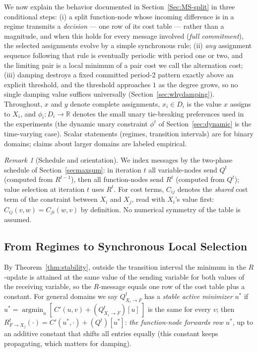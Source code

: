 \documentclass[letterpaper]{article} %
\theoremstyle{definition}
\theoremstyle{remark}
\newtheorem{remark}[theorem]{Remark}
\begin{document}
We now explain the behavior documented in Section~\ref{Sec:MS-split} in
three conditional steps: (i) a split function-node whose incoming
difference is in a regime transmits a \emph{decision} --- one row of its
cost table --- rather than a magnitude, and when this holds for every
message involved (\emph{full commitment}), the selected assignments evolve
by a simple synchronous rule; (ii) \emph{any} assignment sequence
following that rule is eventually periodic with period one or two, and the
limiting pair is a local minimum of a pair cost we call the alternation
cost; (iii) damping destroys a fixed committed period-2 pattern exactly
above an explicit threshold, and the threshold approaches $1$ as the
degree grows, so no single damping value suffices universally
(Section~\ref{sec:whydamping}).  Throughout, $x$ and $y$ denote complete
assignments, $x_i \in D_i$ is the value $x$ assigns to $X_i$, and
$\phi_i : D_i \to \mathbb{R}$ denotes the small unary tie-breaking
preferences used in the experiments (the dynamic unary constraint
$\phi^t$ of Section~\ref{sec:dynamic} is the time-varying case).  Scalar
statements (regimes, transition intervals) are for binary domains; claims
about larger domains are labeled empirical.

\begin{remark}[Schedule and orientation]\label{rem:conv}
We index messages by the two-phase schedule of
Section~\ref{secmaxsum}: in iteration $t$ all variable-nodes send
$Q^{t}$ (computed from $R^{t-1}$), then all function-nodes send $R^{t}$
(computed from $Q^{t}$); value selection at iteration $t$ uses $R^{t}$.
For cost terms, $C_{ij}$ denotes the \emph{shared} cost term of the
constraint between $X_i$ and $X_j$, read with $X_i$'s value first:
$C_{ij}(v, w) = C_{ji}(w, v)$ by definition.  No numerical symmetry of
the table is assumed.
\end{remark}

\subsection{From Regimes to Synchronous Local Selection}\label{sec:rule}

By Theorem~\ref{thm:stability}, outside the transition interval the
minimum in the $R$-update is attained at the same value of the sending
variable for both values of the receiving variable, so the $R$-message
equals one row of the cost table plus a constant.  For general domains we
say $Q^{t}_{X_i \to F}$ has a \emph{stable active minimizer} $u^{*}$ if
$u^{*} = \operatorname{argmin}_{u}[\,C'(u,v) + (Q^{t}_{X_i\to F})[u]\,]$
is the same for every $v$; then $R^{t}_{F\to X_j}(\cdot) =
C'(u^{*},\cdot) + (Q^{t})[u^{*}]$: \emph{the function-node forwards row
$u^{*}$}, up to an additive constant that shifts all entries equally
(this constant keeps propagating, which matters for damping).
\end{document}
